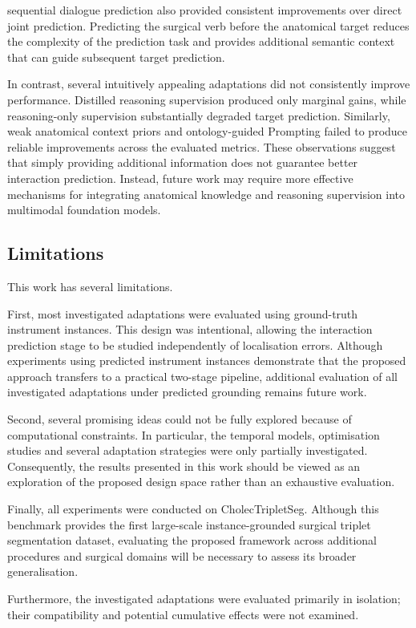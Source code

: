 \documentclass[11pt]{article}
\begin{document}
sequential dialogue prediction also provided consistent improvements over direct joint prediction. Predicting the surgical verb before the anatomical target reduces the complexity of the prediction task and provides additional semantic context that can guide subsequent target prediction.

In contrast, several intuitively appealing adaptations did not consistently improve performance. Distilled reasoning supervision produced only marginal gains, while reasoning-only supervision substantially degraded target prediction. Similarly, weak anatomical context priors and ontology-guided Prompting failed to produce reliable improvements across the evaluated metrics. These observations suggest that simply providing additional information does not guarantee better interaction prediction. Instead, future work may require more effective mechanisms for integrating anatomical knowledge and reasoning supervision into multimodal foundation models.

\subsection{Limitations}

This work has several limitations.

First, most investigated adaptations were evaluated using ground-truth instrument instances. This design was intentional, allowing the interaction prediction stage to be studied independently of localisation errors. Although experiments using predicted instrument instances demonstrate that the proposed approach transfers to a practical two-stage pipeline, additional evaluation of all investigated adaptations under predicted grounding remains future work.

Second, several promising ideas could not be fully explored because of computational constraints. In particular, the temporal models, optimisation studies and several adaptation strategies were only partially investigated. Consequently, the results presented in this work should be viewed as an exploration of the proposed design space rather than an exhaustive evaluation.

Finally, all experiments were conducted on CholecTripletSeg. Although this benchmark provides the first large-scale instance-grounded surgical triplet segmentation dataset, evaluating the proposed framework across additional procedures and surgical domains will be necessary to assess its broader generalisation.

Furthermore, the investigated adaptations were evaluated primarily in isolation;
their compatibility and potential cumulative effects were not examined.
\end{document}
